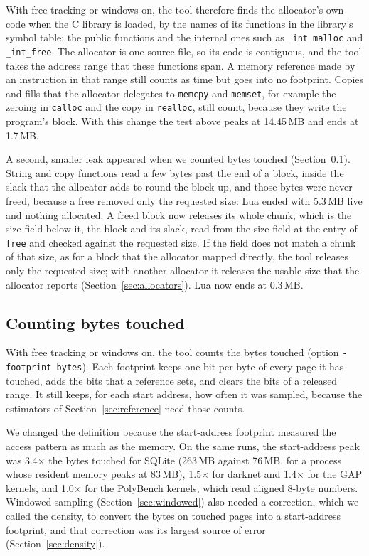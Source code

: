 \documentclass[11pt]{article}
\newcommand{\knob}[1]{\texttt{-#1}}
\newcommand{\secref}[1]{Section~\ref{#1}}
\begin{document}
With free tracking or windows on, the tool therefore finds the allocator's own code when the C library is loaded, by the names of its functions in the library's symbol table: the public functions and the internal ones such as \texttt{\_int\_malloc} and \texttt{\_int\_free}. The allocator is one source file, so its code is contiguous, and the tool takes the address range that these functions span. A memory reference made by an instruction in that range still counts as time but goes into no footprint. Copies and fills that the allocator delegates to \texttt{memcpy} and \texttt{memset}, for example the zeroing in \texttt{calloc} and the copy in \texttt{realloc}, still count, because they write the program's block. With this change the test above peaks at 14.45\,MB and ends at 1.7\,MB.

A second, smaller leak appeared when we counted bytes touched (\secref{sec:definition}). String and copy functions read a few bytes past the end of a block, inside the slack that the allocator adds to round the block up, and those bytes were never freed, because a free removed only the requested size: Lua ended with 5.3\,MB live and nothing allocated. A freed block now releases its whole chunk, which is the size field below it, the block and its slack, read from the size field at the entry of \texttt{free} and checked against the requested size. If the field does not match a chunk of that size, as for a block that the allocator mapped directly, the tool releases only the requested size; with another allocator it releases the usable size that the allocator reports (\secref{sec:allocators}). Lua now ends at 0.3\,MB.

\subsection{Counting bytes touched}
\label{sec:definition}

With free tracking or windows on, the tool counts the bytes touched (option \knob{footprint bytes}). Each footprint keeps one bit per byte of every page it has touched, adds the bits that a reference sets, and clears the bits of a released range. It still keeps, for each start address, how often it was sampled, because the estimators of \secref{sec:reference} need those counts.

We changed the definition because the start-address footprint measured the access pattern as much as the memory. On the same runs, the start-address peak was 3.4$\times$ the bytes touched for SQLite (263\,MB against 76\,MB, for a process whose resident memory peaks at 83\,MB), 1.5$\times$ for darknet and 1.4$\times$ for the GAP kernels, and 1.0$\times$ for the PolyBench kernels, which read aligned 8-byte numbers. Windowed sampling (\secref{sec:windowed}) also needed a correction, which we called the density, to convert the bytes on touched pages into a start-address footprint, and that correction was its largest source of error (\secref{sec:density}).
\end{document}
